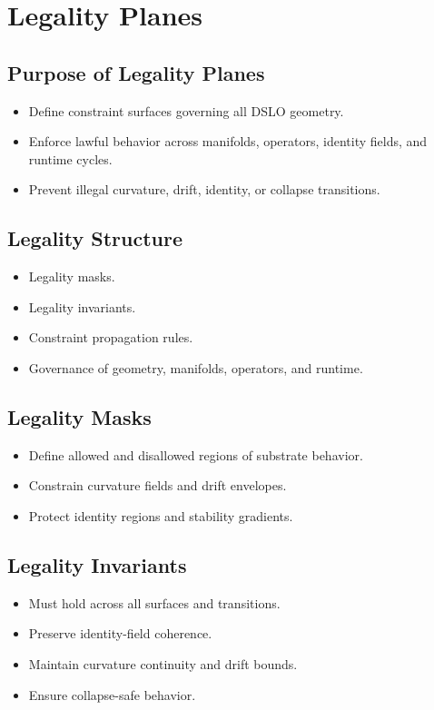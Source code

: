 \section{Legality Planes}

\subsection{Purpose of Legality Planes}
\begin{itemize}
    \item Define constraint surfaces governing all DSLO geometry.
    \item Enforce lawful behavior across manifolds, operators, identity fields, and runtime cycles.
    \item Prevent illegal curvature, drift, identity, or collapse transitions.
\end{itemize}

\subsection{Legality Structure}
\begin{itemize}
    \item Legality masks.
    \item Legality invariants.
    \item Constraint propagation rules.
    \item Governance of geometry, manifolds, operators, and runtime.
\end{itemize}

\subsection{Legality Masks}
\begin{itemize}
    \item Define allowed and disallowed regions of substrate behavior.
    \item Constrain curvature fields and drift envelopes.
    \item Protect identity regions and stability gradients.
\end{itemize}

\subsection{Legality Invariants}
\begin{itemize}
    \item Must hold across all surfaces and transitions.
    \item Preserve identity-field coherence.
    \item Maintain curvature continuity and drift bounds.
    \item Ensure collapse-safe behavior.
\end{itemize}

